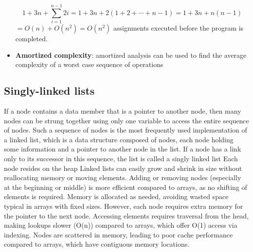 \documentclass{report}
\begin{document}
\begin{itemize}
\[
1 + 3n + \sum_{i=1}^{n-1} 2i = 1 + 3n + 2(1 + 2 + \cdots + n - 1) = 1 + 3n + n(n - 1)
\]
$= O(n) + O(n^2) = O(n^2)$ assignments executed before the program is completed.
\item \textbf{Amortized complexity}: amortized analysis can be used
to find the average complexity of a worst case sequence of operations















   \end{itemize}
    





    \pagebreak 
    \bigbreak \noindent 
    \subsection{Singly-linked lists}
    \bigbreak \noindent 
    If a node contains a data member that is a pointer to another node, then many nodes
    can be strung together using only one variable to access the entire sequence of nodes.
    Such a sequence of nodes is the most frequently used implementation of a linked list,
    which is a data structure composed of nodes, each node holding some information
    and a pointer to another node in the list. If a node has a link only to its successor in
    this sequence, the list is called a singly linked list
    \bigbreak \noindent 
    Each node resides on the heap
    \bigbreak \noindent 
    Linked lists can easily grow and shrink in size without reallocating memory or moving elements. Adding or removing nodes (especially at the beginning or middle) is more efficient compared to arrays, as no shifting of elements is required. Memory is allocated as needed, avoiding wasted space typical in arrays with fixed sizes.
    \bigbreak \noindent 
    However, each node requires extra memory for the pointer to the next node. Accessing elements requires traversal from the head, making lookups slower (O(n)) compared to arrays, which offer O(1) access via indexing.  Nodes are scattered in memory, leading to poor cache performance compared to arrays, which have contiguous memory locations.



    \bigbreak \noindent 
\end{document}
